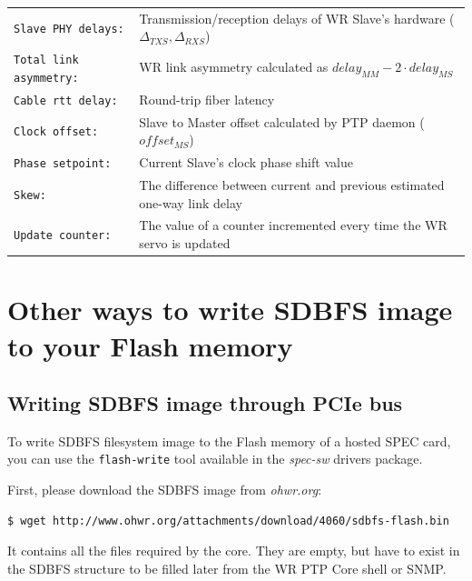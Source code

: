\documentclass[a4paper, 12pt]{article}
\renewcommand{\_}{\underscore\allowbreak}
\newcommand{\code}[1]{\texttt{#1}}
\begin{document}
\begin{longtable}{  p{4.5cm}  p{10cm} }
  \code{Slave PHY delays:} & Transmission/reception delays of WR Slave's
    hardware ($\Delta_{TXS}, \Delta_{RXS}$)\\

  \code{Total link asymmetry:} & WR link asymmetry calculated as
    $delay_{MM} - 2 \cdot delay_{MS}$\\

  \code{Cable rtt delay:} & Round-trip fiber latency\\

  \code{Clock offset:} & Slave to Master offset calculated by PTP daemon
  ($ offset_{MS} $)\\

  \code{Phase setpoint:} & Current Slave's clock phase shift value\\

  \code{Skew:} & The difference between current and previous estimated
    one-way link delay\\

  \code{Update counter:} & The value of a counter incremented every time
    the WR servo is updated\\

\end{longtable}
\renewcommand\arraystretch{1}


\clearpage
\section{Other ways to write SDBFS image to your Flash memory}
\label{appendix:writing_sdbfs}

\subsection{Writing SDBFS image through PCIe bus}
To write SDBFS filesystem image to the Flash memory of a hosted SPEC card, you
can use the \texttt{flash-write} tool available in the \emph{spec-sw} drivers
package.

First, please download the SDBFS image from \textit{ohwr.org}:
\begin{lstlisting}
$ wget http://www.ohwr.org/attachments/download/4060/sdbfs-flash.bin
\end{lstlisting}
It contains all the files required by the core. They are empty, but have to
exist in the SDBFS structure to be filled later from the WR PTP Core shell or
SNMP.\\
\end{document}
